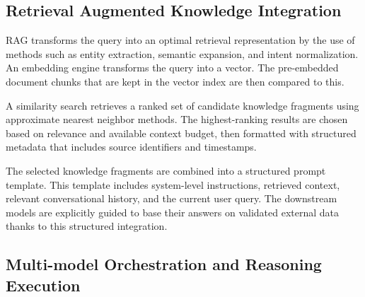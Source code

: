\documentclass[final,5p,times,twocolumn,authoryear,draft]{elsarticle}
\begin{document}


\subsection{Retrieval Augmented Knowledge Integration}


RAG transforms the query into an optimal retrieval representation by the use of methods such as entity extraction, semantic expansion, and intent normalization. An embedding engine transforms the query into a vector. The pre-embedded document chunks that are kept in the vector index are then compared to this.

A similarity search retrieves a ranked set of candidate knowledge fragments using approximate nearest neighbor methods. The highest-ranking results are chosen based on relevance and available context budget, then formatted with structured metadata that includes source identifiers and timestamps.

The selected knowledge fragments are combined into a structured prompt template. This template includes system-level instructions, retrieved context, relevant conversational history, and the current user query. The downstream models are explicitly guided to base their answers on validated external data thanks to this structured integration.


\subsection{Multi-model Orchestration and Reasoning Execution}
\end{document}
